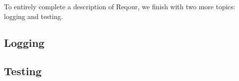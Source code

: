 \documentclass[../main.tex]{subfiles}
\begin{document}
To entirely complete a description of Reqour, we finish with two more topics: logging and testing.

\subsection{Logging}


\subsection{Testing}

\end{document}
